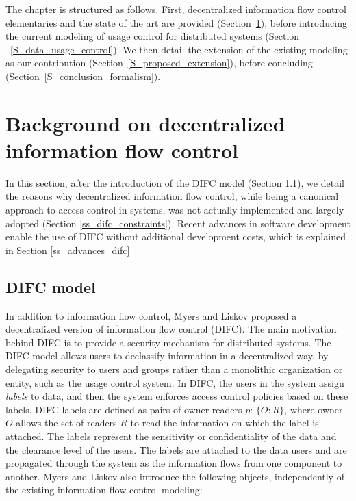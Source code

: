 The chapter is structured as follows. First, decentralized information flow control elementaries and the state of the art are provided (Section~\ref{S_DIFC}), before introducing the current modeling of usage control for distributed systems (Section ~\ref{S_data_usage_control}). We then detail the extension of the existing modeling as our contribution (Section~\ref{S_proposed_extension}), before concluding (Section~\ref{S_conclusion_formalism}).
\section{Background on decentralized information flow control}
\label{S_DIFC}

In this section, after the introduction of the DIFC model (Section \ref{ss_DIFC_model}), we detail the reasons why decentralized information flow control, while being a canonical approach to access control in systems, was not actually implemented and largely adopted (Section \ref{ss_difc_constraints}). Recent advances in software development enable the use of DIFC without additional development costs, which is explained in Section \ref{ss_advances_difc}

\subsection{DIFC model}
\label{ss_DIFC_model}
In addition to information flow control, Myers and Liskov \cite{Myers1997} proposed a decentralized version of information flow control (DIFC).
The main motivation behind DIFC is to provide a security mechanism for distributed systems. The DIFC model allows users to declassify information in a decentralized way, by delegating security to users and groups rather than a monolithic organization or entity, such as the usage control system.
In DIFC, the users in the system assign \emph{labels} to data, and then the system enforces access control policies based on these labels. DIFC labels are defined as pairs of owner-readers $p$: $\{O : R\}$, where owner $O$ allows the set of readers  $R$ to read the information on which the label is attached. The labels represent the sensitivity or confidentiality of the data and the clearance level of the users. The labels are attached to the data  users and are propagated through the system as the information flows from one component to another. 
Myers and Liskov \cite{Myers1997} also introduce the following objects, independently of the existing information flow control modeling:

